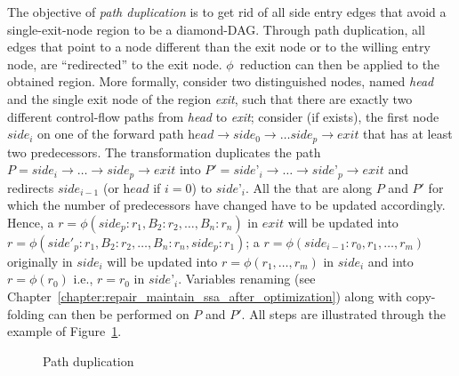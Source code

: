 The objective of \emph{path duplication} is to get rid of all side entry edges that avoid a single-exit-node region to be a diamond-DAG. Through path duplication, all edges that point to a node different than the exit node or to the willing entry node, are ``redirected'' to the exit node. $\phi$~reduction can then be applied to the obtained region. More formally, consider two distinguished nodes, named \textit{head} and the single exit node of the region \textit{exit}, such that there are exactly two different control-flow paths from \textit{head} to \textit{exit}; consider (if exists), the first node $\textit{side}_i$ on one of the forward path $\textit{head}\rightarrow \textit{side}_0\rightarrow\dots\textit{side}_p\rightarrow\textit{exit}$ that has at least two predecessors. The transformation duplicates the path $P=\textit{side}_i\rightarrow\dots\rightarrow\textit{side}_p\rightarrow\textit{exit}$ into $P'=\textit{side'}_i\rightarrow\dots\rightarrow\textit{side'}_p\rightarrow\textit{exit}$ and redirects $\textit{side}_{i-1}$ (or $\textit{head}$ if $i=0$) to $\textit{side'}_i$. All the \phifuns that are along $P$ and $P'$  for which the number of predecessors have changed have to be updated accordingly. Hence, a $r=\phi(\textit{side}_p:r_1,B_2:r_2,\dots,B_n:r_n)$ in $\textit{exit}$  will be updated into $r=\phi(\textit{side}'_p:r_1,B_2:r_2,\dots,B_n:r_n,\textit{side}_p:r_1)$; a $r=\phi(\textit{side}_{i-1}:r_0, r_1, \dots, r_m)$ originally in $\textit{side}_i$ will be updated into $r=\phi(r_1, \dots, r_m)$ in $\textit{side}_i$ and into $r=\phi(r_0)$ i.e., $r=r_0$ in $\textit{side'}_i$. Variables renaming (see Chapter~\ref{chapter:repair_maintain_ssa_after_optimization}) along with copy-folding can then be performed on $P$ and $P'$. All steps are illustrated  through the example of Figure~\ref{fig:phi_aug}.


\begin{figure}[h]

  \caption{\label{fig:phi_aug}Path duplication}
\end{figure}


